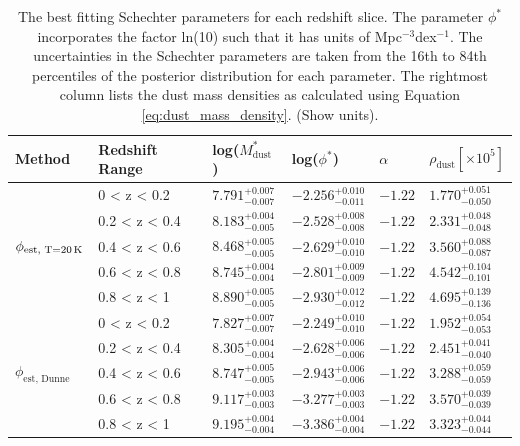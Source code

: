 \begin{table}
    \centering
    \begin{tabular}{p{2.5cm}|p{2.5cm}|p{2cm}|p{2cm}|p{2cm}|p{2cm}}
        \hline
        \hline
        Method & Redshift Range & log($M_{\textrm{dust}}^*$) & log($\phi^*$) & $\alpha$ & $\rho_{\textrm{dust}} [\times10^5]$ \\
        \hline
        \hline
        \multirow{5}{*}{$\phi_{\textrm{est, T=20\,K}}$} & 0 < z < 0.2 & $7.791^{+0.007}_{-0.007}$ & $-2.256^{+0.010}_{-0.011}$ & $-1.22$ & $1.770^{+0.051}_{-0.050}$ \\
        & 0.2 < z < 0.4 & $8.183^{+0.004}_{-0.005}$ & $-2.528^{+0.008}_{-0.008}$ & $-1.22$ & $2.331^{+0.048}_{-0.048}$ \\
        & 0.4 < z < 0.6 & $8.468^{+0.005}_{-0.005}$ & $-2.629^{+0.010}_{-0.010}$ & $-1.22$ & $3.560^{+0.088}_{-0.087}$ \\
        & 0.6 < z < 0.8 & $8.745^{+0.004}_{-0.004}$ & $-2.801^{+0.009}_{-0.009}$ & $-1.22$ & $4.542^{+0.104}_{-0.101}$ \\
        & 0.8 < z < 1 & $8.890^{+0.005}_{-0.005}$ & $-2.930^{+0.012}_{-0.012}$ & $-1.22$ & $4.695^{+0.139}_{-0.136}$ \\
        \hline
        \multirow{5}{*}{$\phi_{\textrm{est, Dunne}}$} & 0 < z < 0.2 & $7.827^{+0.007}_{-0.007}$ & $-2.249^{+0.010}_{-0.010}$ & $-1.22$ & $1.952^{+0.054}_{-0.053}$ \\
        & 0.2 < z < 0.4 & $8.305^{+0.004}_{-0.004}$ & $-2.628^{+0.006}_{-0.006}$ & $-1.22$ & $2.451^{+0.041}_{-0.040}$ \\
        & 0.4 < z < 0.6 & $8.747^{+0.005}_{-0.005}$ & $-2.943^{+0.006}_{-0.006}$ & $-1.22$ & $3.288^{+0.059}_{-0.059}$ \\
        & 0.6 < z < 0.8 & $9.117^{+0.003}_{-0.003}$ & $-3.277^{+0.003}_{-0.003}$ & $-1.22$ & $3.570^{+0.039}_{-0.039}$ \\
        & 0.8 < z < 1 & $9.195^{+0.004}_{-0.004}$ & $-3.386^{+0.004}_{-0.004}$ & $-1.22$ & $3.323^{+0.044}_{-0.044}$ \\
        \hline
    \end{tabular}
    \caption{The best fitting Schechter parameters for each redshift slice. The parameter $\phi^*$ incorporates the factor ln(10) such that it has units of Mpc$^{-3}$dex$^{-1}$. The uncertainties in the Schechter parameters are taken from the 16th to 84th percentiles of the posterior distribution for each parameter. The rightmost column lists the dust mass densities as calculated using Equation \ref{eq:dust_mass_density}. {\color{red}(Show units).}}
    \label{tab:schechter_parameters}
\end{table}


